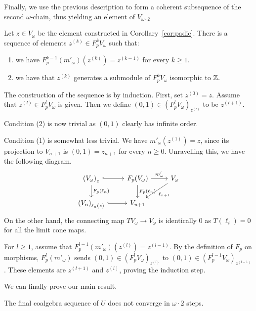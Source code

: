 \documentclass[runningheads]{llncs}
\begin{document}
Finally, we use the previous description to form a coherent subsequence of the second $\omega$-chain, thus yielding an element of $V_{\omega \cdot 2}$
\begin{propositionE}
\label{prop:limit_descrip}
Let $z\in V_{\omega}$ be the element constructed in Corollary~\ref{cor:padic}. There is a sequence of elements $z^{(k)} \in F_p^k V_{\omega}$ such that:
\begin{enumerate}
\item
we have $F_p^{k-1}(m'_{\omega})(z^{(k)}) = z^{(k-1)}$ for every $k\geq 1$.
\item
we have that $z^{(k)}$ generates a submodule of $F_p^k V_{\omega}$ isomorphic to $\mathbb{Z}.$
\end{enumerate}
\end{propositionE}
\begin{proofE}
The construction of the sequence is by induction. First, set $z^{(0)} = z.$ Assume that $z^{(l)} \in F_p^l V_\omega$ is given. Then we define $(0,1) \in (F_p^{l} V_{\omega})_{z^{(l)}}$ to be $z^{(l+1)}.$ 

Condition (2) is now trivial as $(0,1)$ clearly has infinite order. 

Condition (1) is somewhat less trivial.
We have $m'_{\omega}(z^{(1)})=z$, since its projection to $V_{n+1}$ is $(0,1)=z_{n+1}$ for every $n\geq 0$. Unravelling this, we have the following diagram.
$$
\begin{tikzcd}
\left(V_{\omega}\right)_z  \dar{F_p(\ell_n )} \arrow[r, hook]& F_p(V_{\omega}) \dar{F_p(\ell_n)}\rar{m'_{\omega}} & V_\omega \arrow[dl, "\ell_{n+1}"]
\\
\left(V_n\right)_{\ell_n(z)} \arrow[r, hook]& V_{n+1}
\end{tikzcd}
$$
On the other hand, the connecting map $TV_{\omega} \to V_{\omega}$ is identically 0 as $T(\ell_i) = 0$ for all the limit cone maps. 


For $l\geq 1$, assume that $F_p^{l-1}(m'_{\omega})(z^{(l)})=z^{(l-1)}$. By the definition of $F_p$ on morphisms, $F_p^l(m'_{\omega})$ sends $(0,1)\in (F_p^lV_{\omega})_{z^{(l)}}$ to $(0,1)\in (F_p^{l-1}V_{\omega})_{z^{(l-1)}}$. These elements are $z^{(l+1)}$ and $z^{(l)}$, proving the induction step.
\end{proofE}
We can finally prove our main result.
\begin{theorem}
The final coalgebra sequence of $U$ does not converge in $\omega \cdot 2$ steps.
\end{theorem}
\end{document}
